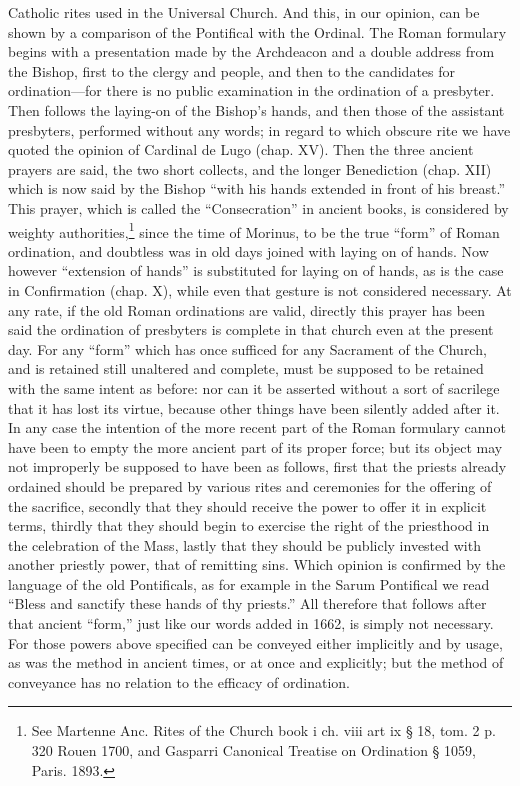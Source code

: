 Catholic rites used in the Universal Church. And this, in our opinion, can be shown by a comparison of the Pontifical with the Ordinal. The Roman formulary begins with a presentation made by the Archdeacon and a double address from the Bishop, first to the clergy and people, and then to the candidates for ordination—for there is no public examination in the ordination of a presbyter. Then follows the laying-on of the Bishop’s hands, and then those of the assistant presbyters, performed without any words; in regard to which obscure rite we have quoted the opinion of Cardinal de Lugo (chap. XV). Then the three ancient prayers are said, the two short collects, and the longer Benediction (chap. XII) which is now said by the Bishop “with his hands extended in front of his breast.” This prayer, which is called the “Consecration” in ancient books, is considered by weighty authorities,\footnote{See Martenne Anc. Rites of the Church book i ch. viii art ix § 18, tom. 2 p. 320 Rouen 1700, and Gasparri Canonical Treatise on Ordination § 1059, Paris. 1893.} since the time of Morinus, to be the true “form” of Roman ordination, and doubtless was in old days joined with laying on of hands. Now however “extension of hands” is substituted for laying on of hands, as is the case in Confirmation (chap. X), while even that gesture is not considered necessary. At any rate, if the old Roman ordinations are valid, directly this prayer has been said the ordination of presbyters is complete in that church even at the present day. For any “form” which has once sufficed for any Sacrament of the Church, and is retained still unaltered and complete, must be supposed to be retained with the same intent as before: nor can it be asserted without a sort of sacrilege that it has lost its virtue, because other things have been silently added after it. In any case the intention of the more recent part of the Roman formulary cannot have been to empty the more ancient part of its proper force; but its object may not improperly be supposed to have been as follows, first that the priests already ordained should be prepared by various rites and ceremonies for the offering of the sacrifice, secondly that they should receive the power to offer it in explicit terms, thirdly that they should begin to exercise the right of the priesthood in the celebration of the Mass, lastly that they should be publicly invested with another priestly power, that of remitting sins. Which opinion is confirmed by the language of the old Pontificals, as for example in the Sarum Pontifical we read “Bless and sanctify these hands of thy priests.” All therefore that follows after that ancient “form,” just like our words added in 1662, is simply not necessary. For those powers above specified can be conveyed either implicitly and by usage, as was the method in ancient times, or at once and explicitly; but the method of conveyance has no relation to the efficacy of ordination.

